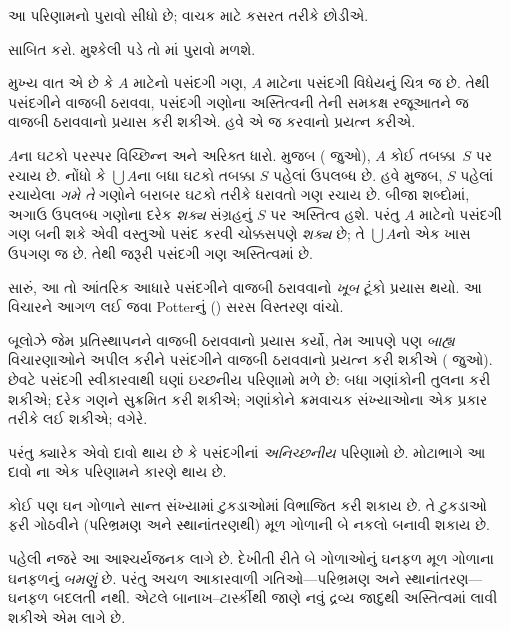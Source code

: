 આ પરિણામનો પુરાવો સીધો છે;
વાચક માટે કસરત તરીકે છોડીએ.

\begin{prob}
સાબિત કરો. મુશ્કેલી પડે તો
\cite[pp.~242--3]{Potter2004}માં
પુરાવો મળશે.
\end{prob}

મુખ્ય વાત એ છે કે $A$ માટેનો પસંદગી
ગણ, $A$ માટેના પસંદગી વિધેયનું
ચિત્ર જ છે. તેથી પસંદગીને વાજબી
ઠરાવવા, પસંદગી ગણોના અસ્તિત્વની
તેની સમકક્ષ રજૂઆતને જ વાજબી
ઠરાવવાનો પ્રયાસ કરી શકીએ.
હવે એ જ કરવાનો પ્રયત્ન કરીએ.

$A$ના ઘટકો પરસ્પર વિચ્છિન્ન
અને અરિક્ત ધારો. \stageshier{} મુજબ
( જુઓ), $A$
કોઈ તબક્કા~$S$ પર રચાય છે.
નોંધો કે $\bigcup A$ના બધા
ઘટકો તબક્કા $S$ પહેલાં
ઉપલબ્ધ છે. હવે \stagesacc{} મુજબ,
$S$ પહેલાં રચાયેલા \emph{ગમે તે}
ગણોને બરાબર ઘટકો તરીકે ધરાવતો
ગણ રચાય છે. બીજા શબ્દોમાં,
અગાઉ ઉપલબ્ધ ગણોના દરેક
\emph{શક્ય} સંગ્રહનું $S$ પર
અસ્તિત્વ હશે. પરંતુ $A$ માટેનો
પસંદગી ગણ બની શકે એવી વસ્તુઓ
પસંદ કરવી ચોક્કસપણે \emph{શક્ય}
છે; તે $\bigcup A$નો એક ખાસ
ઉપગણ જ છે. તેથી જરૂરી પસંદગી
ગણ અસ્તિત્વમાં છે.

સારું, આ તો આંતરિક આધારે પસંદગીને
વાજબી ઠરાવવાનો \emph{ખૂબ} ટૂંકો
પ્રયાસ થયો. આ વિચારને આગળ
લઈ જવા Potterનું
(\citeyear[\S14.8]{Potter2004})
સરસ વિસ્તરણ વાંચો.
\endgroup

\begingroup
\makeatletter{}\makeatother

\label{guunit:OLP-0599}


બૂલોઝે જેમ પ્રતિસ્થાપનને વાજબી
ઠરાવવાનો પ્રયાસ કર્યો, તેમ આપણે
પણ \emph{બાહ્ય} વિચારણાઓને અપીલ
કરીને પસંદગીને વાજબી ઠરાવવાનો
પ્રયત્ન કરી શકીએ
( જુઓ).
છેવટે પસંદગી સ્વીકારવાથી ઘણાં
ઇચ્છનીય પરિણામો મળે છે: બધા ગણાંકોની
તુલના કરી શકીએ; દરેક ગણને સુક્રમિત
કરી શકીએ; ગણાંકોને ક્રમવાચક
સંખ્યાઓના એક પ્રકાર તરીકે લઈ શકીએ;
વગેરે.

પરંતુ ક્યારેક એવો દાવો થાય છે કે
પસંદગીનાં \emph{અનિચ્છનીય} પરિણામો
છે. મોટાભાગે આ દાવો
\cite{BanachTarski1924}ના એક
પરિણામને કારણે થાય છે.

\begin{thm}[બાનાખ--ટાર્સ્કીનો વિરોધાભાસ ($\ZFC$માં)]
કોઈ પણ ઘન ગોળાને સાન્ત સંખ્યામાં
ટુકડાઓમાં વિભાજિત કરી શકાય છે.
તે ટુકડાઓ ફરી ગોઠવીને (પરિભ્રમણ
અને સ્થાનાંતરણથી) મૂળ ગોળાની
બે નકલો બનાવી શકાય છે.
\end{thm}
\noindent
પહેલી નજરે આ આશ્ચર્યજનક લાગે છે.
દેખીતી રીતે બે ગોળાઓનું ઘનફળ
મૂળ ગોળાના ઘનફળનું \emph{બમણું} છે.
પરંતુ અચળ આકારવાળી ગતિઓ---પરિભ્રમણ
અને સ્થાનાંતરણ---ઘનફળ બદલતી નથી.
એટલે બાનાખ--ટાર્સ્કીથી જાણે
નવું દ્રવ્ય જાદુથી અસ્તિત્વમાં
લાવી શકીએ એમ લાગે છે.

